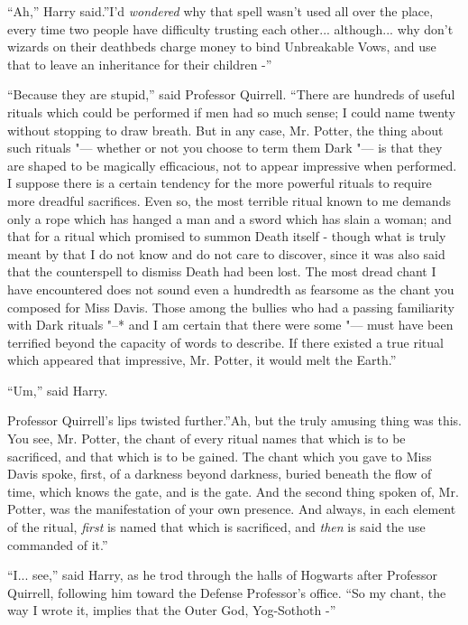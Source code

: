 ``Ah,'' Harry said.''I'd \emph{wondered} why that spell wasn't used all
over the place, every time two people have difficulty trusting each
other... although... why don't wizards on their deathbeds
charge money to bind Unbreakable Vows, and use that to leave an
inheritance for their children -''

``Because they are stupid,'' said Professor Quirrell. ``There are
hundreds of useful rituals which could be performed if men had so much
sense; I could name twenty without stopping to draw breath. But in any
case, Mr. Potter, the thing about such rituals "--- whether or not you
choose to term them Dark "--- is that they are shaped to be magically
efficacious, not to appear impressive when performed. I suppose there is
a certain tendency for the more powerful rituals to require more
dreadful sacrifices. Even so, the most terrible ritual known to me
demands only a rope which has hanged a man and a sword which has slain a
woman; and that for a ritual which promised to summon Death itself -
though what is truly meant by that I do not know and do not care to
discover, since it was also said that the counterspell to dismiss Death
had been lost. The most dread chant I have encountered does not sound
even a hundredth as fearsome as the chant you composed for Miss Davis.
Those among the bullies who had a passing familiarity with Dark rituals
"--* and I am certain that there were some "--- must have been terrified
beyond the capacity of words to describe. If there existed a true ritual
which appeared that impressive, Mr. Potter, it would melt the Earth.''

``Um,'' said Harry.

Professor Quirrell's lips twisted further.''Ah, but the truly amusing
thing was this. You see, Mr. Potter, the chant of every ritual names
that which is to be sacrificed, and that which is to be gained. The
chant which you gave to Miss Davis spoke, first, of a darkness beyond
darkness, buried beneath the flow of time, which knows the gate, and is
the gate. And the second thing spoken of, Mr. Potter, was the
manifestation of your own presence. And always, in each element of the
ritual, \emph{first} is named that which is sacrificed, and \emph{then}
is said the use commanded of it.''

``I... see,'' said Harry, as he trod through the halls of Hogwarts
after Professor Quirrell, following him toward the Defense Professor's
office. ``So my chant, the way I wrote it, implies that the Outer God,
Yog-Sothoth -''

